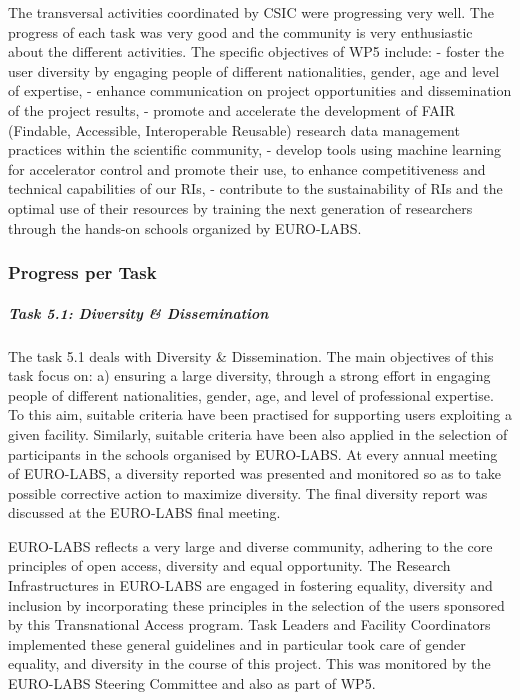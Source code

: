 The transversal activities coordinated by CSIC were progressing very well. The progress of each task was very good and the community is very enthusiastic about the different activities. 
The specific objectives  of WP5 include:
- foster the user diversity by engaging people of different nationalities, gender, age and level of expertise, 
- enhance communication on project opportunities and dissemination of the project results, 
- promote and accelerate the development of FAIR (Findable, Accessible, Interoperable Reusable) research data management practices within the scientific community, 
- develop tools using machine learning for accelerator control and promote their use, to enhance competitiveness and technical capabilities of our RIs, 
- contribute to the sustainability of RIs and the optimal use of their resources by training the next generation of researchers through the hands-on schools organized by EURO-LABS. 

\subsubsection*{Progress per Task}
\subparagraph{Task 5.1: Diversity \& Dissemination\\}

The task 5.1 deals with Diversity \& Dissemination.
The main objectives of this task focus on:
a) ensuring a large diversity, through a strong effort in engaging people of different nationalities, gender, age, and level of professional expertise. 
To this aim, suitable criteria have been practised for supporting users exploiting a given facility. Similarly, suitable criteria have been also applied in the selection of participants in the schools organised by EURO-LABS. At every annual meeting of EURO-LABS, a diversity reported was presented and monitored so as to take possible corrective action to maximize diversity. The final diversity report was discussed at the EURO-LABS final meeting. 

EURO-LABS reflects a very large and diverse community, adhering to the core principles of open access, diversity and equal opportunity. The Research Infrastructures in EURO-LABS are engaged in fostering equality, diversity and inclusion by incorporating these principles in the selection of the users sponsored by this Transnational Access program. Task Leaders and Facility Coordinators implemented  these general guidelines and in particular took care of gender equality, and diversity in the course of this project. This was monitored by the EURO-LABS Steering Committee and also as part of WP5.

